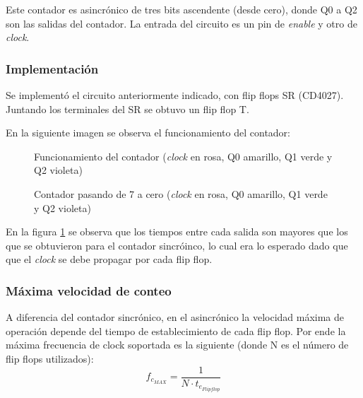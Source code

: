 \documentclass[../../e3_tp2_main.tex]{subfiles}
\begin{document}
Este contador es asincr\'onico de tres bits ascendente (desde cero), donde Q0 a Q2 son las salidas del contador. La entrada del circuito es un pin de \textit{enable} y otro de \textit{clock}.

\subsubsection{Implementación}
Se implementó el circuito anteriormente indicado, con flip flops SR (CD4027). Juntando los terminales del SR se obtuvo un flip flop T.

\par En la siguiente imagen se observa el funcionamiento del contador:

\begin{figure}[H]	
	\centering
	\caption{Funcionamiento del contador (\textit{clock} en rosa, Q0 amarillo, Q1 verde y Q2 violeta)}
\end{figure}

\begin{figure}[H]	
	\centering
	\caption{Contador pasando de 7 a cero (\textit{clock} en rosa, Q0 amarillo, Q1 verde y Q2 violeta)} \label{fig:as1t0}
\end{figure}

En la figura \ref{fig:as1t0} se observa que los tiempos entre cada salida son mayores que los que se obtuvieron para el contador sincr\'oinco, lo cual era lo esperado dado que que el \textit{clock} se debe propagar por cada flip flop.

\subsubsection{Máxima velocidad de conteo}
A diferencia del contador sincrónico, en el asincrónico la velocidad máxima de operación depende del tiempo de establecimiento de cada flip flop. Por ende la máxima frecuencia de clock soportada es la siguiente (donde N es el n\'umero de flip flops utilizados):
$$f_{c_{MAX}}=\frac{1}{N \cdot t_{e_{Flipflop}}} $$
\end{document}

